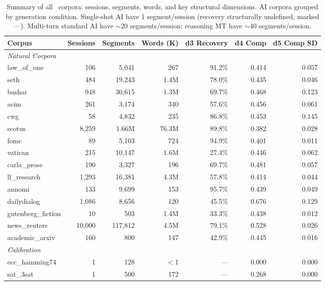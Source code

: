 \documentclass[final]{clv2025}
\begin{document}
\clearpage


\begin{table}[h!]
\centering
\tiny
\caption{Summary of all \nCorpora\ corpora: sessions, segments, words, and key structural dimensions. AI corpora grouped by generation condition. Single-shot AI have 1 segment/session (recovery structurally undefined, marked ---). Multi-turn standard AI have $\sim$20 segments/session; reasoning MT have $\sim$40 segments/session.}
\label{tbl:corpus-summary}
\begin{tabular}{lrrrrrr}
\toprule
\textbf{Corpus} & \textbf{Sessions} & \textbf{Segments} & \textbf{Words (K)} & \textbf{d3 Recovery} & \textbf{d4 Comp} & \textbf{d5 Comp SD} \\
\midrule
\multicolumn{7}{l}{\textit{Natural Corpora}} \\
law\_of\_one & 106 & 5,041 & 267 & 91.2\% & 0.414 & 0.057 \\
seth & 484 & 19,243 & 1.4M & 78.0\% & 0.435 & 0.046 \\
bashar & 948 & 30,615 & 1.3M & 69.7\% & 0.468 & 0.123 \\
acim & 261 & 3,174 & 340 & 57.6\% & 0.456 & 0.061 \\
cwg & 58 & 4,832 & 235 & 86.8\% & 0.453 & 0.145 \\
scotus & 8,259 & 1.66M & 76.3M & 89.8\% & 0.382 & 0.028 \\
fomc & 89 & 5,103 & 724 & 94.9\% & 0.401 & 0.011 \\
vatican & 215 & 10,147 & 1.6M & 27.4\% & 0.446 & 0.062 \\
carla\_prose & 190 & 3,327 & 196 & 69.7\% & 0.481 & 0.057 \\
ll\_research & 1,293 & 16,381 & 4.3M & 57.8\% & 0.414 & 0.044 \\
annomi & 133 & 9,699 & 153 & 95.7\% & 0.439 & 0.049 \\
dailydialog & 1,086 & 8,656 & 120 & 45.5\% & 0.676 & 0.129 \\
gutenberg\_fiction & 10 & 503 & 1.4M & 33.3\% & 0.438 & 0.012 \\
news\_reuters & 10,000 & 117,812 & 4.5M & 79.1\% & 0.528 & 0.026 \\
academic\_arxiv & 160 & 800 & 147 & 42.9\% & 0.445 & 0.016 \\
\midrule
\multicolumn{7}{l}{\textit{Calibration}} \\
ecc\_hamming74 & 1 & 128 & $<$1 & --- & 0.000 & 0.000 \\
sat\_3sat & 1 & 500 & 172 & --- & 0.268 & 0.000 \\

\end{tabular}
\end{table}
\end{document}
